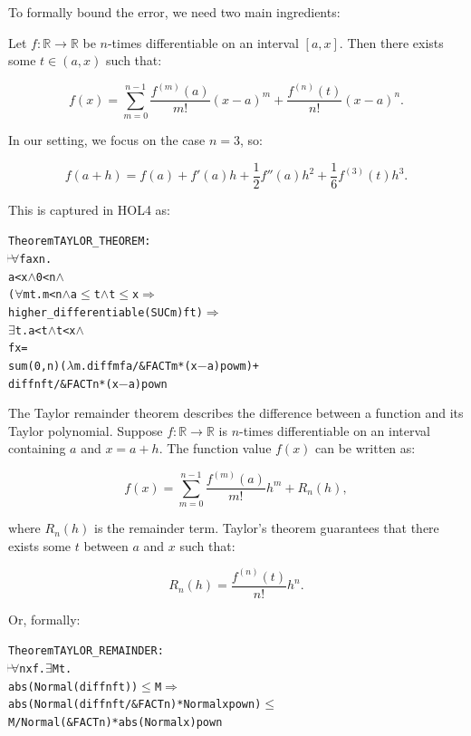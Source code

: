 To formally bound the error, we need two main ingredients:

\begin{theorem}
  \label{thm:taylor}
Let $f : \mathbb{R} \to \mathbb{R}$ be $n$-times differentiable on an interval $[a, x]$. Then there exists some $t \in (a, x)$ such that:

\[
f(x) =
\sum_{m=0}^{n-1} \frac{f^{(m)}(a)}{m!} (x - a)^m +
\frac{f^{(n)}(t)}{n!} (x - a)^n.
\]

In our setting, we focus on the case $n = 3$, so:

\[
f(a + h) =
f(a) + f'(a)h + \frac{1}{2}f''(a)h^2 + \frac{1}{6}f^{(3)}(t)h^3.
\]
\end{theorem}

This is captured in HOL4 as:

\begin{hol}
  \begin{alltt}
    Theorem TAYLOR\_THEOREM :
    \(\!\!\!{\turn}\!\!\!\!\) \(\forall\)f a x n.
    a < x \(\land\) 0 < n \(\land\)
    (\(\forall\)m t. m < n \(\land\) a \(\le\) t \(\land\) t \(\le\) x \(\Rightarrow\)
    higher\_differentiable (SUC m) f t) \(\Rightarrow\)
    \(\exists\)t. a < t \(\land\) t < x \(\land\)
    f x =
    sum (0,n) (\(\lambda\)m. diff m f a / \&FACT m * (x \({-}\) a) pow m) +
    diff n f t / \&FACT n * (x \({-}\) a) pow n
  \end{alltt}
\end{hol}

\begin{theorem}
\label{thm:taylor-remainder}
The Taylor remainder theorem describes the difference between a function and its Taylor polynomial. Suppose $f : \mathbb{R} \to \mathbb{R}$ is $n$-times differentiable on an interval containing $a$ and $x = a + h$. The function value $f(x)$ can be written as:

\[
f(x) = \sum_{m=0}^{n-1} \frac{f^{(m)}(a)}{m!} h^m + R_n(h),
\]

where $R_n(h)$ is the remainder term. Taylor's theorem guarantees that there exists some $t$ between $a$ and $x$ such that:

\[
R_n(h) = \frac{f^{(n)}(t)}{n!} h^n.
\]
\end{theorem}

Or, formally:
\begin{hol}
  \begin{alltt}
    Theorem TAYLOR\_REMAINDER :
    \(\!\!\!{\turn}\!\!\!\!\) \(\forall\)n x f. \(\exists\)M t.
    abs (Normal (diff n f t)) \(\le\) M \(\Rightarrow\)
    abs (Normal (diff n f t / \&FACT n) * Normal x pow n) \(\le\)
    M / Normal (\&FACT n) * abs (Normal x) pow n
  \end{alltt}
\end{hol}

